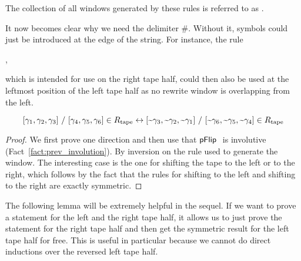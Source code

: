 The collection of all windows generated by these rules is referred to as \mnotec[tapeRules]{$\Rtape$}.

\begin{remark}
  It now becomes clear why we need the delimiter $\#$. Without it, symbols could just be introduced at the edge of the string. For instance, the rule 
  \begin{center}
    ,
  \end{center}
  which is intended for use on the right tape half, could then also be used at the leftmost position of the left tape half as no rewrite window is overlapping from the left.
\end{remark}

\begin{lemma}\label{lem:symm_rtape}
  \[[\gamma_1, \gamma_2, \gamma_3]~/~[\gamma_4, \gamma_5, \gamma_6] \in R_{\text{tape}} \leftrightarrow [\text{\textasciitilde}\gamma_3, \text{\textasciitilde}\gamma_2, \text{\textasciitilde}\gamma_1]~/~[\text{\textasciitilde}\gamma_6, \text{\textasciitilde}\gamma_5, \text{\textasciitilde}\gamma_4] \in R_{\text{tape}} \]
\end{lemma}
\begin{proof}
  We first prove one direction and then use that $\pFlip$ is involutive (Fact~\ref{fact:prev_involution}).
  By inversion on the rule used to generate the window. The interesting case is the one for shifting the tape to the left or to the right, which follows by the fact that the rules for shifting to the left and shifting to the right are exactly symmetric. 
\end{proof}

The following lemma will be extremely helpful in the sequel.
If we want to prove a statement for the left and the right tape half, it allows us to just prove the statement for the right tape half and then get the symmetric result for the left tape half for free. This is useful in particular because we cannot do direct inductions over the reversed left tape half. 

